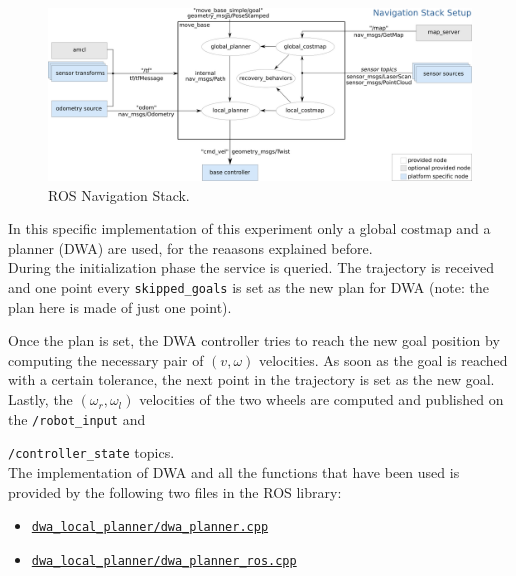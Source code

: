\documentclass[11pt,a4paper]{article}
\begin{document}
\begin{figure}[H]
    \centering
    \includegraphics[scale=0.4]{other/navigation_stack.png}
    \caption{ROS Navigation Stack.}
\end{figure}

In this specific implementation of this experiment only a global costmap and a planner (DWA) are used,
for the reaasons explained before.\\

During the initialization phase the service is queried.
The trajectory is received and one point every \texttt{skipped\_goals} is set as the new plan for DWA
(note: the plan here is made of just one point).

Once the plan is set, the DWA controller tries to reach the new goal position by computing the necessary
pair of $(v, \omega)$ velocities. As soon as the goal is reached with a certain tolerance, the next point
in the trajectory is set as the new goal.\\

Lastly, the $(\omega_r,\omega_l)$ velocities of the two wheels are computed and published on the
\texttt{/robot\_input} and

\texttt{/controller\_state} topics.\\

The implementation of DWA and all the functions that have been used is provided by the following
two files in the ROS library:
\begin{itemize}
    \item \href{https://docs.ros.org/en/melodic/api/dwa\_local\_planner/html/dwa\_\_planner\_8cpp\_source.html}
            {\texttt{dwa\_local\_planner/dwa\_planner.cpp}}
    \item \href{https://docs.ros.org/en/melodic/api/dwa\_local\_planner/html/dwa\_\_planner\_\_ros\_8cpp\_source.html}
            {\texttt{dwa\_local\_planner/dwa\_planner\_ros.cpp}}
\end{itemize}
\end{document}
